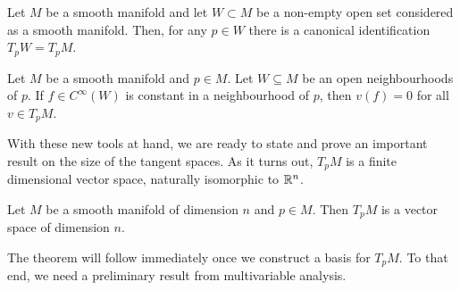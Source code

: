 \begin{corollary}\label{cor:tgsubspace}
  Let $M$ be a smooth manifold and let $W\subset M$ be a non-empty open set considered as a smooth manifold.
  Then, for any $p\in W$ there is a canonical identification $T_pW = T_p M$.
\end{corollary}

\begin{corollary}\label{cor:derzero}
  Let $M$ be a smooth manifold and $p\in M$.
  Let $W\subseteq M$ be an open neighbourhoods of $p$.
  If $f\in C^\infty(W)$ is constant in a neighbourhood of $p$, then $v(f) = 0$ for all $v\in T_p M$.
\end{corollary}

With these new tools at hand, we are ready to state and prove an important result on the size of the tangent spaces.
As it turns out, $T_pM$ is a finite dimensional vector space, naturally isomorphic to $\mathbb{R}^n$.

\begin{theorem}\label{thm:dimensionTpM}
  Let $M$ be a smooth manifold of dimension $n$ and $p\in M$.
  Then $T_pM$ is a vector space of dimension $n$.
\end{theorem}

The theorem will follow immediately once we construct a basis for $T_pM$.
To that end, we need a preliminary result from multivariable analysis.

